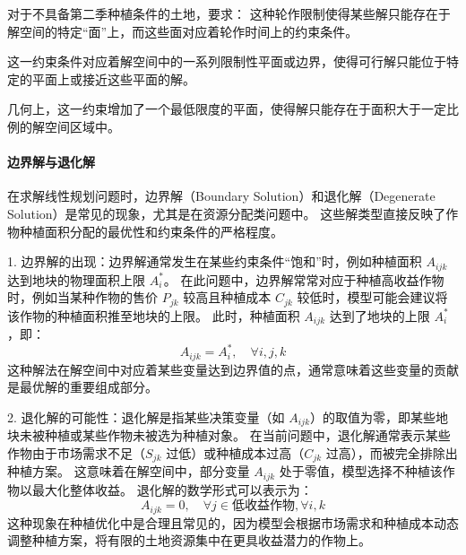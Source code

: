 \documentclass[12pt,a4paper]{nmmcm}
\begin{document}
对于不具备第二季种植条件的土地，要求：
这种轮作限制使得某些解只能存在于解空间的特定“面”上，而这些面对应着轮作时间上的约束条件。


这一约束条件对应着解空间中的一系列限制性平面或边界，使得可行解只能位于特定的平面上或接近这些平面的解。


几何上，这一约束增加了一个最低限度的平面，使得解只能存在于面积大于一定比例的解空间区域中。


\paragraph{边界解与退化解}

在求解线性规划问题时，边界解（Boundary Solution）和退化解（Degenerate Solution）是常见的现象，尤其是在资源分配类问题中。
这些解类型直接反映了作物种植面积分配的最优性和约束条件的严格程度。


1. 边界解的出现：边界解通常发生在某些约束条件“饱和”时，例如种植面积 $A_{ijk}$ 达到地块的物理面积上限 $A_i^*$。
在此问题中，边界解常常对应于种植高收益作物时，例如当某种作物的售价 $P_{jk}$ 较高且种植成本 $C_{jk}$ 较低时，模型可能会建议将该作物的种植面积推至地块的上限。
此时，种植面积 $A_{ijk}$ 达到了地块的上限 $A_i^*$，即：
\[
  A_{ijk} = A_i^*, \quad \forall i, j, k
\]
这种解法在解空间中对应着某些变量达到边界值的点，通常意味着这些变量的贡献是最优解的重要组成部分。


2. 退化解的可能性：退化解是指某些决策变量（如 $A_{ijk}$）的取值为零，即某些地块未被种植或某些作物未被选为种植对象。
在当前问题中，退化解通常表示某些作物由于市场需求不足（$S_{jk}$ 过低）或种植成本过高（$C_{jk}$ 过高），而被完全排除出种植方案。
这意味着在解空间中，部分变量 $A_{ijk}$ 处于零值，模型选择不种植该作物以最大化整体收益。
退化解的数学形式可以表示为：
\[
  A_{ijk} = 0, \quad \forall j \in \text{低收益作物}, \forall i, k
\]
这种现象在种植优化中是合理且常见的，因为模型会根据市场需求和种植成本动态调整种植方案，将有限的土地资源集中在更具收益潜力的作物上。
\end{document}
